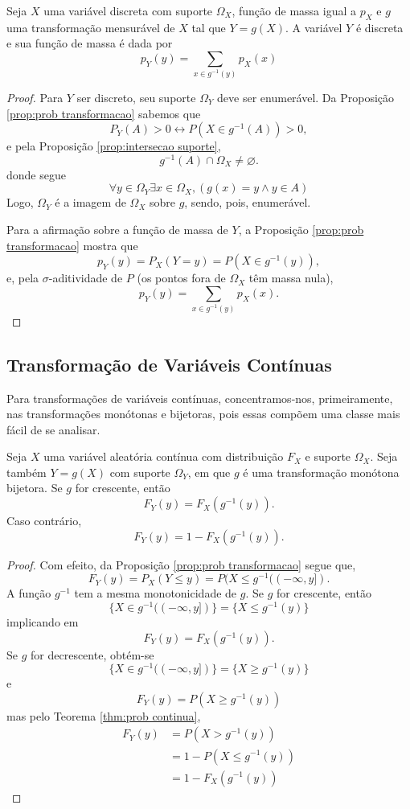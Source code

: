 \begin{thm:prob transformacao discreta}
Seja $X$ uma variável discreta com suporte $\Omega_X$, função de massa igual a $p_X$ e
$g$ uma transformação mensurável de $X$ tal que $Y = g(X)$.
A variável $Y$ é discreta e sua função de massa é dada por
\[
	p_Y(y) = \sum_{x \in g^{-1}(y)} p_X(x)
\]
\begin{proof}
	Para $Y$ ser discreto, seu suporte $\Omega_Y$ deve ser enumerável.
	Da Proposição \ref{prop:prob transformacao} sabemos que
	\[
		P_Y(A) > 0 \leftrightarrow P(X \in g^{-1}(A)) > 0,
	\]
	e pela Proposição \ref{prop:intersecao suporte},
	\[
		g^{-1}(A) \cap \Omega_X \neq \varnothing.
	\]
	donde segue
	\[
		\forall y \in \Omega_Y \exists x \in \Omega_X, (g(x) = y \land y \in A)
	\]
	Logo, $\Omega_Y$ é a imagem de $\Omega_X$ sobre $g$, sendo, pois, enumerável.

	Para a afirmação sobre a função de massa de $Y$, a Proposição \ref{prop:prob transformacao}
	mostra que
	\[
		p_Y(y) = P_X(Y = y) = P(X \in g^{-1}(y)),
	\]
	e, pela $\sigma$-aditividade de $P$ (os pontos fora de $\Omega_X$ têm massa nula),
	\[
		p_Y(y) = \sum_{x \in g^{-1}(y)} p_X(x).
	\]
\end{proof}
\end{thm:prob transformacao discreta}

\subsection{Transformação de Variáveis Contínuas}

Para transformações de variáveis contínuas, concentramos-nos, primeiramente, nas
transformações monótonas e bijetoras, pois essas compõem uma classe mais fácil de se
analisar.

\begin{thm:fda transformacao continua}
\label{thm:fda transformacao continua}
Seja $X$ uma variável aleatória contínua com distribuição $F_X$ e suporte $\Omega_X$.
Seja também $Y=g(X)$ com suporte $\Omega_Y$, em que $g$ é uma transformação monótona
bijetora.
Se $g$ for crescente, então
\[
	F_{Y}(y) =  F_{X}(g^{-1}(y)).
\]
Caso contrário,
\[
	F_{Y}(y) = 1 - F_{X}(g^{-1}(y)).
\]
\begin{proof}
	Com efeito, da Proposição \ref{prop:prob transformacao} segue que,
	\[
		F_Y(y) = P_X(Y \leq y) = P(X \leq g^{-1} ((-\infty, y]).
	\]
	A função $g^{-1}$ tem a mesma monotonicidade de $g$.
	Se $g$ for crescente, então
	\[
		\{X \in g^{-1}((-\infty, y])\} = \{X \le g^{-1}(y)\}
	\]
	implicando em
	\[
		F_Y(y) = F_X(g^{-1}(y)).
	\]
	Se $g$ for decrescente, obtém-se
	\[
		\{X \in g^{-1}((-\infty, y])\} = \{X \ge g^{-1}(y)\}
	\]
	e
	\[
		F_Y(y) = P(X \ge g^{-1}(y))
	\]
	mas pelo Teorema \ref{thm:prob continua},
	\begin{align*}
		F_Y(y) & = P(X > g^{-1}(y))       \\
		       & = 1 - P(X \le g^{-1}(y)) \\
		       & = 1 - F_X(g^{-1}(y))
	\end{align*}
\end{proof}
\end{thm:fda transformacao continua}

